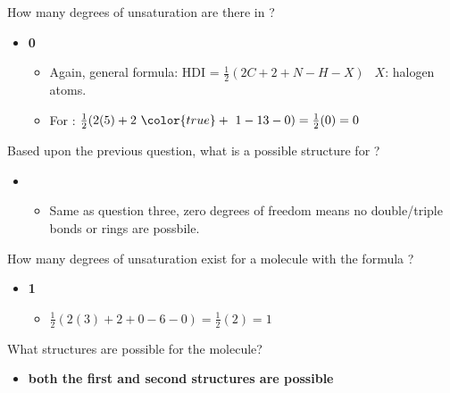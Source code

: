\documentclass[12pt,a4paper]{article}
\begin{document}
\begin{enumerate}
\begin{itemize}
\begin{itemize}
                \end{itemize}
        \end{itemize}
    {\color{G-Moon}\item How many degrees of unsaturation are there in ?}
        \begin{itemize}
            \item {\color{o-Sun}\textbf{0}}
                \begin{itemize}
                    \item Again, general formula: {\color{o-Sun}HDI = \(\frac{1}{2}(2C + 2 + N - H - X)~~\)} \(X\): halogen atoms.
                    \item For :  \(\frac{1}{2}(2(5) + 2~ {\color{true}+~1} - 13 - 0) = \frac{1}{2}(0) = 0\)
                \end{itemize}
        \end{itemize}
    {\color{G-Moon}\item Based upon the previous question, what is a possible structure for ?}
        \begin{itemize}
            \item {\color{o-Sun}}
                \begin{itemize}
                    \item Same as question three, {\color{o-Sun}zero degrees of freedom} means {\color{false}no double/triple bonds or rings} are possbile.
                \end{itemize}
        \end{itemize}
    {\color{G-Moon}\item How many degrees of unsaturation exist for a molecule with the formula ?}
        \begin{itemize}
            \item {\color{o-Sun}\textbf{1}}
                \begin{itemize}
                    \item \(\frac{1}{2}(2(3) + 2 + 0 - 6 - 0) = \frac{1}{2}(2) = 1\)
                \end{itemize}
        \end{itemize}
    {\color{G-Moon}\item What structures are possible for the  molecule?}
        \begin{itemize}
            \item {\color{o-Sun}\textbf{both the first and second structures are possible}}

\end{itemize}
\end{enumerate}
\end{document}
